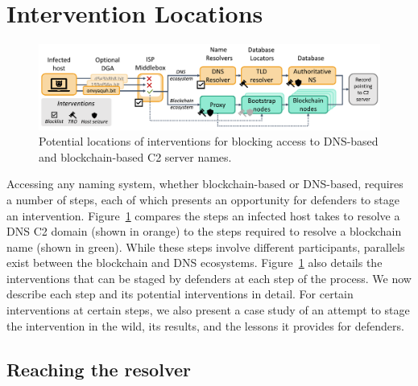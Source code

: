 \section{Intervention Locations}
\label{sec:accessing_records}

\begin{figure}[t]
	\centering
	\includegraphics[width=\textwidth]{figs/intervention_locations.pdf}
	\caption{Potential locations of interventions for 
	blocking access to DNS-based and blockchain-based C2 
	server names.}
	\label{fig:malware_contacting_cnc}
\end{figure}

Accessing any naming system, whether blockchain-based or DNS-based, requires a 
number of steps, each of which presents an opportunity for defenders to stage 
an intervention. Figure~\ref{fig:malware_contacting_cnc} compares the 
steps an infected host takes to resolve a DNS C2 domain 
(shown in orange) to 
the steps required to resolve a blockchain 
name (shown in green). While these steps involve different participants, 
parallels exist between the blockchain and DNS ecosystems. 
Figure~\ref{fig:malware_contacting_cnc} also details the interventions that 
can be staged by defenders at each step of the process. We now describe each 
step and its potential interventions in detail. For certain interventions at 
certain steps, we also present a case study of an attempt to stage the 
intervention in the wild, its results, and the lessons it provides for 
defenders. 

\subsection{Reaching the resolver}

